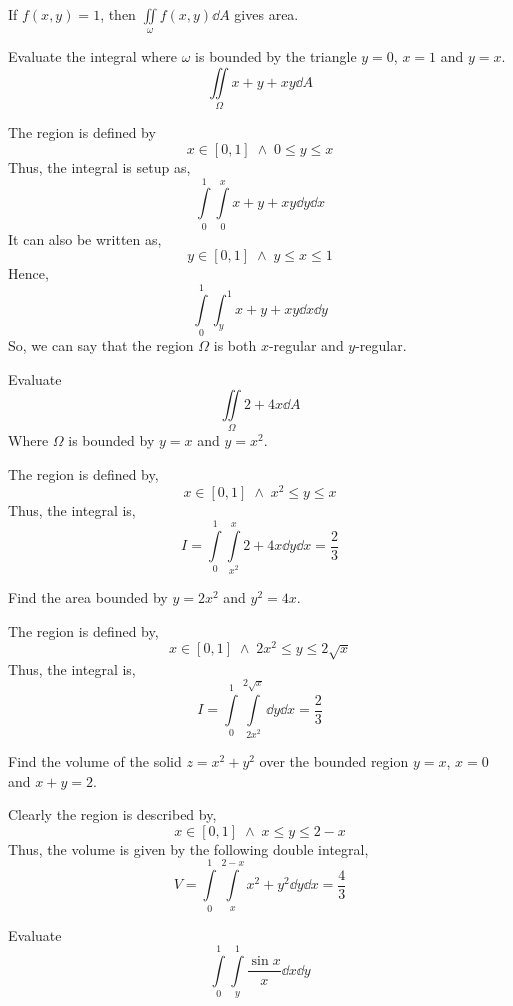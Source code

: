 If $f(x,y)=1$, then $\iint\limits_\omega f(x,y)\dd{A}$ gives area.
\begin{eg}
	Evaluate the integral where $\omega$ is bounded by the triangle $y=0$, $x=1$ and $y=x$.
	\[\iint\limits_\Omega x+y+xy\dd{A}\]
\end{eg}
\begin{explanation}
	The region is defined by
	\[x\in[0,1] \; \land \; 0\leq y\leq x\]
	Thus, the integral is setup as,
	\[\int\limits_0^1\int\limits_0^x x+y+xy\dd{y}\dd{x}\]
	It can also be written as,
	\[y\in[0,1] \; \land \; y\leq x\leq 1\]
	Hence,
	\[\int\limits_0^1\int_y^1 x+y+xy\dd{x}\dd{y}\]
	So, we can say that the region $\Omega$ is both $x$-regular and $y$-regular.
\end{explanation}
\begin{eg}
	Evaluate
	\[\iint\limits_\Omega 2+4x\dd{A}\]
	Where $\Omega$ is bounded by $y=x$ and $y=x^2$.
\end{eg}
\begin{explanation}
	The region is defined by,
	\[x\in[0,1] \; \land \; x^2\leq y\leq x\]
	Thus, the integral is,
	\[I=\int\limits_0^1\int\limits_{x^2}^x 2+4x\dd{y}\dd{x}=\frac{2}{3}\]
\end{explanation}
\begin{eg}
	Find the area bounded by $y=2x^2$ and $y^2=4x$.
\end{eg}
\begin{explanation}
	The region is defined by,
	\[x\in [0,1] \; \land \; 2x^2\leq y \leq 2\sqrt{x}\]
	Thus, the integral is,
	\[I=\int\limits_0^1 \int\limits_{2x^2}^{2\sqrt{x}} \dd{y}\dd{x}=\frac{2}{3}\]
\end{explanation}
\begin{eg}
	Find the volume of the solid $z=x^2+y^2$ over the bounded region $y=x$, $x=0$ and $x+y=2$.
\end{eg}
\begin{explanation}
	Clearly the region is described by,
	\[x\in [0,1] \; \land \; x\leq y \leq 2-x\]
	Thus, the volume is given by the following double integral,
	\[V=\int\limits_0^1\int\limits_{x}^{2-x}x^2+y^2\dd{y}\dd{x}=\frac{4}{3}\]
\end{explanation}
\begin{eg}
	Evaluate
	\[\int\limits_0^1\int\limits_y^1 \frac{\sin x}{x}\dd{x}\dd{y}\]
\end{eg}
